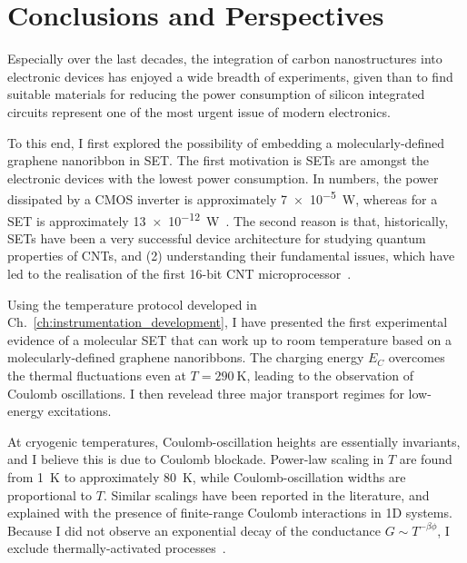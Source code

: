 \chapter{\label{ch:conclusions}Conclusions and Perspectives}

\minitoc

Especially over the last decades, the integration of carbon nanostructures into electronic devices has enjoyed a wide breadth of experiments, given than to find suitable materials for reducing the power consumption of silicon integrated circuits represent one of the most urgent issue of modern electronics.

To this end, I first explored the possibility of embedding a molecularly-defined graphene nanoribbon in \gls{SET}. The first motivation is \glspl{SET} are amongst the electronic devices with the lowest power consumption. In numbers, the power dissipated by a \gls{CMOS} inverter is approximately \SI{7e-5}{\watt}, whereas for a \gls{SET} is approximately \SI{13e-12}{\watt}~\cite{mishra2021power}. The second reason is that, historically, \glspl{SET} have been a very successful device architecture for studying quantum properties of \glspl{CNT}, and (2) understanding their fundamental issues, which have led to the realisation of the first 16-bit \gls{CNT} microprocessor~\cite{hills2019modern}.

Using the temperature protocol developed in Ch.~\ref{ch:instrumentation_development}, I have presented the first experimental evidence of a molecular \gls{SET} that can work up to room temperature based on a molecularly-defined graphene nanoribbons. The charging energy $E_C$ overcomes the thermal fluctuations even at $T=\SI{290}{\kelvin}$, leading to the observation of Coulomb oscillations. I then revelead three major transport regimes for low-energy excitations.

At cryogenic temperatures, Coulomb-oscillation heights are essentially invariants, and I believe this is due to Coulomb blockade. Power-law scaling in $T$ are found from \SI{1}{\kelvin} to approximately \SI{80}{\kelvin}, while Coulomb-oscillation widths are proportional to $T$. Similar scalings have been reported in the literature, and explained with the presence of finite-range Coulomb interactions in 1D systems. Because I did not observe an exponential decay of the conductance $G\sim T^{-\beta\phi}$, I exclude thermally-activated processes~\cite{sols2007coulomb}.

